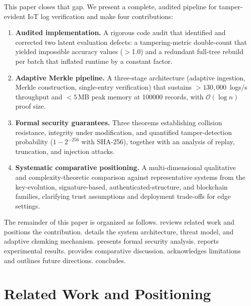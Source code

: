 \documentclass[preprint,12pt]{elsarticle}
\begin{document}
This paper closes that gap.
We present a complete, audited pipeline for tamper-evident IoT log verification and make four contributions:

\begin{enumerate}[leftmargin=*, label=\textbf{C\arabic*.}]
  \item \textbf{Audited implementation.}
    A rigorous code audit that identified and corrected two latent evaluation defects: a tampering-metric double-count that yielded impossible accuracy values ($>$1.0) and a redundant full-tree rebuild per batch that inflated runtime by a constant factor.

  \item \textbf{Adaptive Merkle pipeline.}
    A three-stage architecture (adaptive ingestion, Merkle construction, single-entry verification) that sustains $>\!130{,}000$~logs/s throughput and $<\!5$\,MB peak memory at \num{100000} records, with $\mathcal{O}(\log n)$ proof size.

  \item \textbf{Formal security guarantees.}
    Three theorems establishing collision resistance, integrity under modification, and quantified tamper-detection probability ($1 - 2^{-256}$ with SHA-256), together with an analysis of replay, truncation, and injection attacks.

  \item \textbf{Systematic comparative positioning.}
    A multi-dimensional qualitative and complexity-theoretic comparison against representative systems from the key-evolution, signature-based, authenticated-structure, and blockchain families, clarifying trust assumptions and deployment trade-offs for edge settings.
\end{enumerate}

The remainder of this paper is organized as follows.
 reviews related work and positions the contribution.
 details the system architecture, threat model, and adaptive chunking mechanism.
 presents formal security analysis.
 reports experimental results.
 provides comparative discussion.
 acknowledges limitations and outlines future directions.
 concludes.

\section{Related Work and Positioning}
\label{sec:related}
\end{document}
